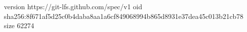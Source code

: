 version https://git-lfs.github.com/spec/v1
oid sha256:8f671af5d25c0b4daba8aa1a6cf849068994b865d8931e37dea45c013b21cb78
size 62274
